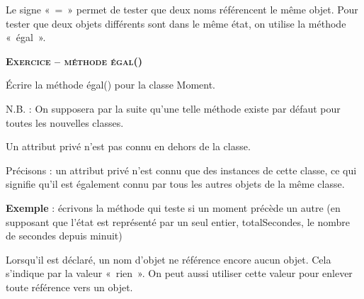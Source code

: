 \begin{liste}
	\item 
		Le signe «~=~» permet de tester que deux noms référencent le même objet.
		Pour tester que deux objets différents sont dans le même état, on
		utilise la méthode «~égal~».
		\\
		\bigskip
\end{liste}

\bigskip

{\sffamily\bfseries\scshape
Exercice – méthode égal()}

Écrire la méthode égal() pour la classe Moment.

\bigskip

N.B. : On supposera par la suite qu'une telle méthode
existe par défaut pour toutes les nouvelles classes.

\begin{liste}
	\item {
		Un attribut privé n'est pas connu en dehors de la
		classe. 
		
		Précisons : un attribut privé n'est connu que
		des instances de cette classe, ce qui signifie qu'il
		est également connu par tous les autres objets de la même
		classe.

		\textbf{Exemple} : écrivons la méthode qui teste si un moment précède un
		autre (en supposant que l'état est représenté par un
		seul entier, totalSecondes, le nombre de secondes depuis minuit)
		\\
		\bigskip
		\bigskip
		}
	\item {
		Lorsqu'il est déclaré, un nom d'objet
		ne référence encore aucun objet. Cela s'indique par la
		valeur «~rien~». On peut aussi utiliser cette valeur pour enlever toute
		référence vers un objet.
		\\
		\bigskip
		}
\end{liste}
	


